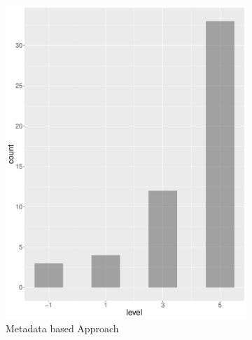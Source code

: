 \begin{figure}
\begin{subfigure}[b]{0.4\textwidth}
        \includegraphics[width=\textwidth]{plots/tennis/hist_level_ec}
        \caption{Metadata based Approach}
        \label{fig:hist_level_tennis_ec}
    \end{subfigure}
    ~
    \begin{subfigure}[b]{0.4\textwidth}

\end{subfigure}
\end{figure}
